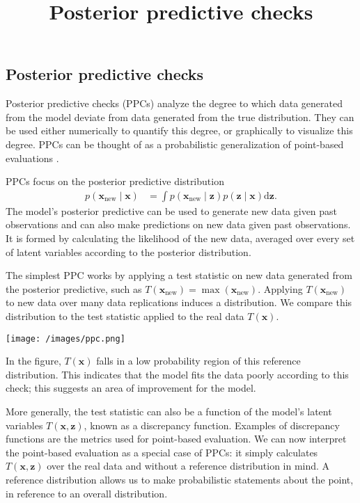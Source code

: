 \title{Posterior predictive checks}

\subsection{Posterior predictive checks}

Posterior predictive checks (PPCs)
analyze the degree to which data generated from the model deviate from
data generated from the true distribution. They can be used either
numerically to quantify this degree, or graphically to visualize this
degree. PPCs can be thought of as a probabilistic generalization of
point-based evaluations
\citep{box1980sampling,rubin1984bayesianly,meng1994posterior,gelman1996posterior}.

PPCs focus on the posterior predictive distribution
\begin{align*}
  p(\mathbf{x}_\text{new} \mid \mathbf{x})
  &=
  \int
  p(\mathbf{x}_\text{new} \mid \mathbf{z})
  p(\mathbf{z} \mid \mathbf{x})
  \text{d} \mathbf{z}.
\end{align*}
The model's posterior predictive can be used to generate new data
given past observations and can also make predictions on new data
given past observations.
It is formed by calculating the likelihood of the new data, averaged
over every set of latent variables according to the posterior
distribution.

The simplest PPC works by applying a test statistic on new data
generated from the posterior predictive, such as
$T(\mathbf{x}_\text{new}) = \max(\mathbf{x}_\text{new})$.  Applying
$T(\mathbf{x}_\text{new})$ to new data over many data replications
induces a distribution. We compare this distribution to the test
statistic applied to the real data $T(\mathbf{x})$.

\texttt{[image: /images/ppc.png]}

In the figure, $T(\mathbf{x})$ falls in a low probability region of
this reference distribution. This indicates that the model fits the
data poorly according to this check; this suggests an area of
improvement for the model.

More generally, the test statistic can also be a function of the
model's latent variables $T(\mathbf{x}, \mathbf{z})$, known as a
discrepancy function.  Examples of discrepancy functions are the
metrics used for point-based evaluation. We can now interpret the
point-based evaluation as a special case of PPCs: it simply calculates
$T(\mathbf{x}, \mathbf{z})$ over the real data and without a reference
distribution in mind. A reference distribution allows us to make
probabilistic statements about the point, in reference to an overall
distribution.

